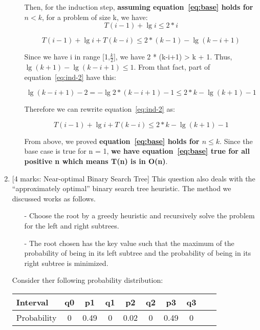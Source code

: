 \documentclass[12pt]{article}
\begin{document}
\begin{enumerate}
\begin{itemize}
Then, for the induction step, \textbf{assuming equation~\ref{eq:base} holds for $n < k$}, for a problem of size k, we have:
\begin{equation} \label{eq:ind-1}
T(i-1) + \lg{i} \leq 2 * i
\end{equation}

\begin{equation} \label{eq:ind-2}
T(i-1) + \lg{i} + T{(k-i)} \leq 2 * (k-1) - \lg{(k-i+1)}
\end{equation}

Since we have i in range [1,$\frac{k}{2}$], we have 2 * (k-i+1) > k + 1. Thus, $ \lg{(k+1)} - \lg{(k-i+1)} \leq 1 $. From that fact, part of equation~\ref{eq:ind-2} have this:

\begin{equation} \label{eq:ind-3}
\lg{(k-i+1)} -2 = - \lg{2 * (k-i+1)} - 1 \leq 2 * k - \lg{(k+1)} - 1
\end{equation}

Therefore we can rewrite equation~\ref{eq:ind-2} as:

\begin{equation} \label{eq:ind-3}
T(i-1) + \lg{i} + T{(k-i)} \leq 2 * k - \lg{(k+1)} - 1
\end{equation}

From above, we proved \textbf{equation~\ref{eq:base} holds for $n \leq k$}. Since the base case is true for n = 1, \textbf{we have equation~\ref{eq:base} true for all positive n which means T(n) is in O(n)}.

\end{itemize}

\medskip

\item{} [4 marks: Near-optimal Binary Search Tree]
This question also deals with the “approximately optimal” binary search tree heuristic. The method we discussed works as follows.

\begin{itemize}
\item[-] Choose the root by a greedy heuristic and recursively solve the problem for the left and right subtrees.
\item[-] The root chosen has the key value such that the maximum of the probability of being in its left subtree and the probability of being in its right subtree is minimized.
\end{itemize}

Consider ther following probability distribution:
\begin{center}
\begin{tabular}{l*{8}{c}r}
Interval          & q0 & p1 & q1 & p2 & q2 & p3 & q3                     \\
\hline
Probability       & 0 & 0.49 & 0 & 0.02 & 0 & 0.49 & 0                   \\
\end{tabular}
\end{center}


\end{enumerate}
\end{document}
